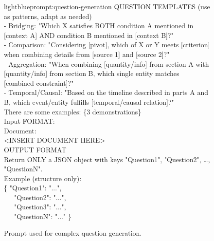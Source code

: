 \documentclass{applemlr}
\numberwithin{equation}{section}
\begin{document}
\begin{figure}[t]
\begin{minipage}{0.95\textwidth}
\begin{promptbox}[\color{black}{Prompt for Complex Question Generation}]{lightblue}{prompt:question-generation}
QUESTION TEMPLATES (use as patterns, adapt as needed) \\
- Bridging: "Which X satisfies BOTH condition A mentioned in [context A] AND condition B mentioned in [context B]?" \\
- Comparison: "Considering [pivot], which of X or Y meets [criterion] when combining details from [source 1] and [source 2]?" \\
- Aggregation: "When combining [quantity/info] from section A with [quantity/info] from section B, which single entity matches [combined constraint]?" \\
- Temporal/Causal: "Based on the timeline described in parts A and B, which event/entity fulfills [temporal/causal relation]?" \\[6pt]

There are some examples: \{3 demonstrations\} \\[6pt]

Input FORMAT: \\
Document: \\
<INSERT DOCUMENT HERE> \\[6pt]

OUTPUT FORMAT \\
Return ONLY a JSON object with keys "Question1", "Question2", …, "QuestionN". \\
Example (structure only): \\
\{  "Question1": "...", \\
\ \ \ "Question2": "...", \\
\ \ \ "Question3": "...", \\
\ \ \ "QuestionN": "..." 
\} \\
\end{promptbox}
\end{minipage}
\caption{Prompt used for complex question generation.}
\label{prompt_question_generation}
\end{figure}
\end{document}
